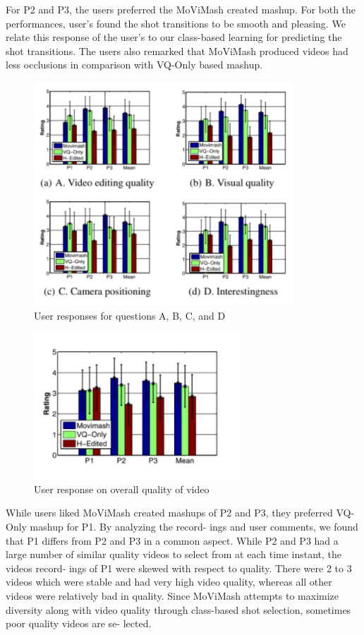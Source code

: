 \documentclass{sig-alternate}
\begin{document}
For P2 and P3, the users preferred the MoViMash created mashup.
For both the performances, user’s found the shot transitions to be
smooth and pleasing. We relate this response of the user’s to our
class-based learning for predicting the shot transitions. The users
also remarked that MoViMash produced videos had less occlusions
in comparison with VQ-Only based mashup.

\begin{figure}
    \centering
    \includegraphics{img7.png}
    \caption{User responses for questions A, B, C, and D}
    \label{fig:my_label}
\end{figure}

\begin{figure}
    \centering
    \includegraphics{img8.png}
    \sevenpt
    \caption{User response on overall quality of video}
    \label{fig:my_label}
\end{figure}

While users liked MoViMash created mashups of P2 and P3,
they preferred VQ-Only mashup for P1. By analyzing the record-
ings and user comments, we found that P1 differs from P2 and P3 in
a common aspect. While P2 and P3 had a large number of similar
quality videos to select from at each time instant, the videos record-
ings of P1 were skewed with respect to quality. There were 2 to 3
videos which were stable and had very high video quality, whereas
all other videos were relatively bad in quality. Since MoViMash
attempts to maximize diversity along with video quality through
class-based shot selection, sometimes poor quality videos are se-
lected.
\end{document}
